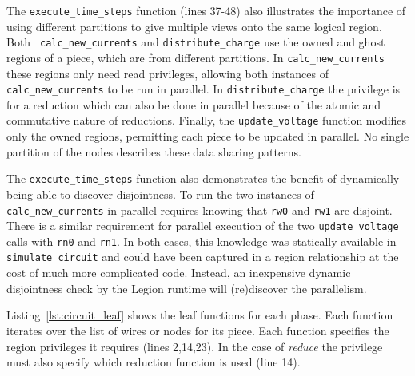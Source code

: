 The {\tt execute\_time\_steps} function (lines 37-48)  
also illustrates the importance of using different partitions to give
multiple views onto the same logical region.  Both {\tt
  calc\_new\_currents} and {\tt distribute\_charge} 
use the owned and ghost regions of a piece, which are from different partitions. In
{\tt calc\_new\_currents} these regions only need read
privileges, allowing both instances of {\tt calc\_new\_currents} to be
run in parallel.  In {\tt distribute\_charge} the
privilege is for a reduction which can also be done in parallel
because of the atomic and commutative nature of reductions.  Finally,
the {\tt update\_voltage} function modifies only the owned regions, permitting
each piece to be updated in parallel.  No
single partition of the nodes
describes these data sharing patterns.

The {\tt execute\_time\_steps} function also demonstrates the benefit of dynamically
being able to discover disjointness.  To run the two instances of 
{\tt calc\_new\_currents} in parallel requires knowing that {\tt rw0}
and {\tt rw1} are disjoint.  There is a similar requirement for parallel
execution of the two {\tt update\_voltage} calls with {\tt rn0} and {\tt rn1}.  In
both cases, this knowledge was statically available in {\tt simulate\_circuit}
and could have been captured in a region relationship at the cost
of much more complicated code.  Instead, an inexpensive dynamic disjointness
check by the Legion runtime will (re)discover the parallelism.

Listing~\ref{lst:circuit_leaf} shows the leaf functions for each phase.
Each function iterates over the list of wires or
nodes for its piece.  Each function specifies the region privileges it
requires (lines 2,14,23).  
In the case of {\em reduce} the
privilege must also specify which reduction function is used
(line 14).

